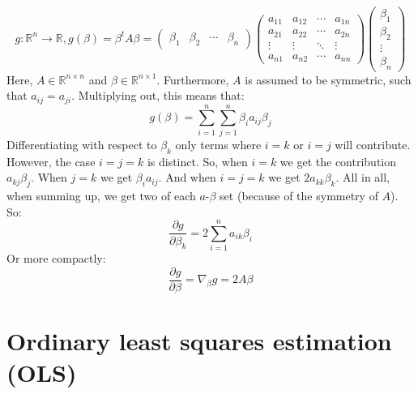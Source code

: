 \documentclass[12pt, a4paper]{article}
\numberwithin{equation}{section}
\begin{document}
\begin{equation}
g: \mathbb{R}^n\rightarrow\mathbb{R}, g(\beta)=\beta^t A\beta =
\begin{pmatrix}
\beta_1 & \beta_2 & \cdots & \beta_n
\end{pmatrix}
\begin{pmatrix}
a_{11} & a_{12} & \cdots & a_{1n} \\
a_{21} & a_{22} & \cdots & a_{2n} \\
\vdots & \vdots & \ddots & \vdots \\
a_{n1} & a_{n2} & \cdots & a_{nn}
\end{pmatrix}
\begin{pmatrix}
\beta_1 \\ \beta_2 \\ \vdots \\ \beta_n
\end{pmatrix}
\end{equation}
Here, $A\in\mathbb{R}^{n\times n}$ and $\beta\in\mathbb{R}^{n\times 1}$. Furthermore, $A$ is assumed to be symmetric, such that $a_{ij}=a_{ji}$. Multiplying out, this means that:
\begin{equation}
g(\beta)=\sum_{i=1}^n\sum_{j=1}^n\beta_i a_{ij}\beta_j
\end{equation}
Differentiating with respect to $\beta_k$ only terms where $i=k$ or $i=j$ will contribute. However, the case $i=j=k$ is distinct. So, when $i=k$ we get the contribution $a_{kj}\beta_j$. When $j=k$ we get $\beta_i a_{ij}$. And when $i=j=k$ we get $2a_{kk}\beta_k$. All in all, when summing up, we get two of each $a$-$\beta$ set (because of the symmetry of $A$). So:
\begin{equation}
\frac{\partial g}{\partial\beta_k}=2\sum_{i=1}^n a_{ik}\beta_i
\end{equation}
Or more compactly:
\begin{equation}
\label{quadformdif}
\frac{\partial g}{\partial \beta}=\nabla_\beta g=2A\beta
\end{equation}

\section{Ordinary least squares estimation (OLS)}
\end{document}
